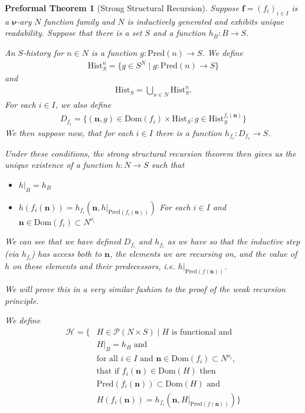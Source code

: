 \documentclass[oneside, 12pt]{book}
\theoremstyle{break}
\newtheorem{preformal definition}[definition]{Preformal Definition}
\newtheorem{preformal theorem}[theorem]{Preformal Theorem}
\newcommand{\bv}[1]{\boldsymbol{#1}}
\newcommand{\mc}[1]{\mathcal{#1}}
\begin{document}
			\begin{preformal theorem}[Strong Structural Recursion]
				Suppose $\bv{f} = (f_i)_{i\in I}$ is a $\bv{\nu}$-ary $N$ function family and $N$ is inductively generated and exhibits unique readability.
				Suppose that there is a set $S$ and a function $h_B: B \to S$.
				
				An $S$-history for $n\in N$ is a function $g:\text{Pred}(n) \to S$.
				We define
				\begin{align*}
					\text{Hist}_S^n = \{g \in S^N \mid g: \text{Pred}(n) \to S\}
				\end{align*}
				and
				\begin{align*}
					\text{Hist}_S = \bigcup_{n\in N} \text{Hist}_S^n.
				\end{align*}
				For each $i\in I$, we also define
				\begin{align*}
					D_{f_i} = \{(\bv{n}, g) \in \text{Dom}(f_i) \times \text{Hist}_S: g \in \text{Hist}_S^{f_i(\bv{n})} \}
				\end{align*}
				We then suppose now, that for each $i\in I$ there is a function $h_{f_i}: D_{f_i} \to S$.
				
				Under these conditions, the strong structural recursion theorem then gives us the unique existence of a function $h: N \to S$ such that
				\begin{itemize}
					\item{$h|_B = h_B$}
					\item{$h(f_i(\bv{n})) = h_{f_i}(\bv{n}, h|_{\text{Pred}(f_i(\bv{n}))})$ For each $i\in I$ and $\bv{n} \in \text{Dom}(f_i) \subset N^{\nu_i}$}
				\end{itemize}
				We can see that we have defined $D_{f_i}$ and $h_{f_i}$ as we have so that the inductive step (via $h_{f_i}$) has access both to $\bv{n}$, the elements we are recursing on, and the value of $h$ on these elements and their predecessors, i.e. $h|_{\text{Pred}(f(\bv{n}))}$.
				
				We will prove this in a very similar fashion to the proof of the weak recursion principle.
				
				We define
				\begin{align*}
					\mc{H} = \{& H \in \mc{P}(N\times S) \mid H \text{ is functional and}\\
					&H|_B = h_B \text{ and }\\
					&\text{for all } i \in I \text{ and } \bv{n} \in \text{Dom}(f_i) \subset N^{\nu_i},\\
					&\text{that if } f_i(\bv{n}) \in \text{Dom}(H) \text{ then}\\
					&\text{Pred}(f_i(\bv{n})) \subset \text{Dom}(H) \text{ and}\\
					&H(f_i(\bv{n})) = h_{f_i}(\bv{n}, H|_{\text{Pred}(f(\bv{n}))})\}
				\end{align*}
				

\end{preformal theorem}
\end{document}
